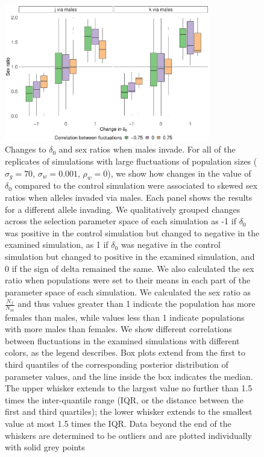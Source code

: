 \documentclass[12pt]{article}
\begin{document}
\begin{figure}[H]
  \centerline{\includegraphics[width=0.8\textwidth]{males.pdf}}
  \caption{ Changes to $\delta_{0}$ and sex ratios when males invade. For all of the replicates of simulations with large fluctuations of population sizes ($\sigma_{g}=70$, $\sigma_{w}=0.001$, $\rho_{w}=0$), we show how changes in the value of  $\delta_{0}$ compared to the control simulation were associated to skewed sex ratios when alleles invaded via males. Each panel shows the results for a different allele invading.  We qualitatively grouped changes across the selection parameter space of each simulation as -1 if $\delta_{0}$ was positive in the control simulation but changed to negative in the examined simulation, as 1 if $\delta_{0}$ was negative in the control simulation but changed to positive in the examined simulation, and 0 if the sign of delta remained the same. We also calculated the sex ratio when populations were set to their means in each part of the parameter space of each simulation. We calculated the sex ratio as $\frac{N_{f}}{N_{m}}$ and thus values greater than 1 indicate the population has more females than males, while values less than 1 indicate populations with more males than females. We show different correlations between fluctuations in the examined simulations with different colors, as the legend describes. Box plots extend from the first to third quantiles of the corresponding posterior distribution of parameter values, and the line inside the box indicates the median. The upper whisker extends to the largest value no further than 1.5 times the inter-quantile range (IQR, or the distance between the first and third quartiles); the lower whisker extends to the smallest value at most 1.5 times the IQR. Data beyond the end of the whiskers are determined to be outliers and are plotted individually with solid grey points }

\end{figure}
\end{document}
